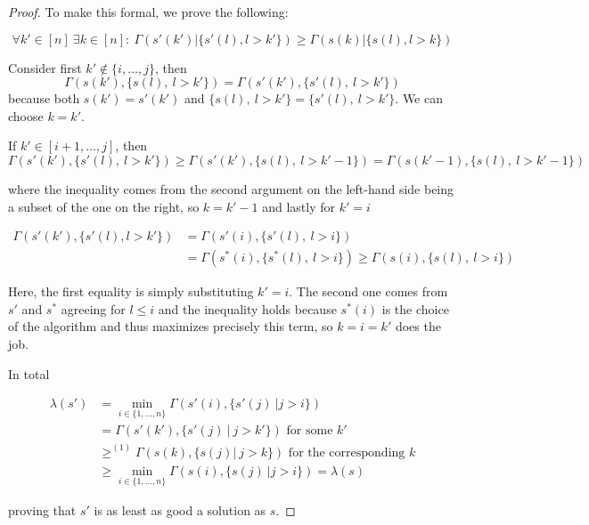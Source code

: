 \documentclass[a4paper,11pt]{article}
\begin{document}
\begin{proof}
  To make this formal, we prove the following:

  \begin{equation}
    \forall k'\in[n]\ \exists k\in[n]:\ \Gamma(s'(k')|\{s'(l), l>k'\})\geq\Gamma(s(k)|\{s(l), l>k\})
  \end{equation}

  Consider first $k'\notin \{i,\dots,j\}$, then
  \[\Gamma(s(k'),\{s(l),\ l>k'\}) = \Gamma(s'(k'),\{s'(l),\ l>k'\})\]
  because both $s(k')=s'(k')$ and $\{s(l),\ l>k'\}=\{s'(l),\ l>k'\}$. We can choose $k=k'$.

  If $k'\in [i+1,\dots,j]$, then
  \[ \Gamma(s'(k'),\{s'(l),\ l>k'\}) \geq \Gamma(s'(k'),\{s(l),\ l>k'-1\}) = \Gamma(s(k'-1),\{s(l),\ l>k'-1\})\]

  where the inequality comes from the second argument on the left-hand side being a subset of the one on the right, so $k=k'-1$ and lastly for $k'=i$

  \begin{equation*}
    \begin{split}
      \Gamma(s'(k'),\{s'(l), l>k'\}) &= \Gamma(s'(i),\{s'(l),\ l>i\})\\
				     &=\Gamma(s^*(i),\{s^*(l),\ l>i\})\geq\Gamma(s(i),\{s(l),\ l>i\})
    \end{split}
  \end{equation*}

  Here, the first equality is simply substituting $k'=i$. The second one comes from $s'$ and $s^*$ agreeing for $l\leq i$ and the inequality holds because $s^*(i)$ is the choice of the algorithm and thus maximizes precisely this term, so $k=i=k'$ does the job.

  In total

  \begin{equation*}
    \begin{split}
      \lambda(s') &=  \min_{i \in \{1,\dots,n\}} \Gamma(s'(i), \{s'(j)\ | j > i\})\\
		  &= \Gamma(s'(k'), \{s'(j)\ |\ j > k'\}) \text{ for some }k'\\
		  &\geq^{(1)} \Gamma(s(k), \{s(j)|\ j>k \}) \text{ for the corresponding }k\\
		  &\geq \min_{i \in \{1,\dots,n\}} \Gamma(s(i), \{s(j)\ | j > i\}) = \lambda(s)
    \end{split}
  \end{equation*}

  proving that $s'$ is as least as good a solution as $s$.
\end{proof}
\end{document}
